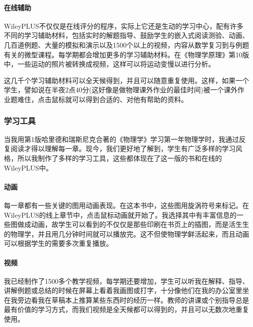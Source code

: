 \paragraph{在线辅助}WileyPLUS不仅仅是在线评分的程序，实际上它还是生动的学习中心，配有许多不同的学习辅助材料，包括实时的解题指导、鼓励学生的嵌入式阅读测验、动画、几百道例题、大量的模拟和演示以及1500个以上的视频，内容从数学复习到与例题有关的微型课程。每学期都会增加更多的学习辅助材料。在《物理学原理》第10版中，一些运动的照片被转换成视频，这样可以将运动变慢以进行分析。

这几千个学习辅助材料可以全天候得到，并且可以随意重复使用。这样，如果一个学生，譬如说在半夜2点40分(这好像是做物理课外作业的最佳时间)被一个课外作业题难住，点击鼠标就可以得到合适的、对他有帮助的资料。

\subsubsection*{学习工具}
当我用第1版哈里德和瑞斯尼克合著的《物理学》学习第一年物理学时，我通过反复阅读才得以理解每一章。现今，我们更好地了解到，学生有广泛多样的学习风格，所以我制作了多样的学习工具，这些都体现在了这一版的书和在线的WileyPLUS中。

\paragraph{动画}每一章都有一些关键的图用动画表现。在这本书中，这些图用旋涡符号来标记。在WileyPLUS的线上章节中，点击鼠标动画就开始了。我选择其中有丰富信息的一些图做成动画，故学生可以看到的不仅仅是那些印刷在书页上的插图，而是活生生的物理学，并且用几分钟时间就可以播放完。这不但使物理学鲜活起来，而且动画可以根据学生的需要多次重复播放。

\paragraph{视频}我已经制作了1500多个教学视频，每学期还要增加，学生可以听我在解释、指导、讲解例题或总结的时候在屏幕上看着我画图或打字，十分像他们在我的办公室里坐在我旁边看我在草稿本上推算某些东西时的经历一样。教师的讲课或个别指导总是最有价值的学习方式，而我们视频是全天候都可以得到的，并且可以无数次地重复使用。

